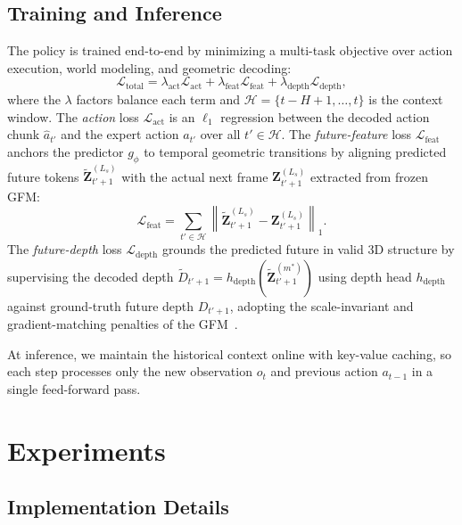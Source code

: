 \documentclass{llmxive}
\begin{document}
\subsection{Training and Inference}
\label{sec:method:training}
The policy is trained end-to-end by minimizing a multi-task objective over action execution, world modeling, and geometric decoding:
\begin{equation}
    \mathcal{L}_{\text{total}} = \lambda_{\text{act}} \mathcal{L}_{\text{act}} + \lambda_{\text{feat}} \mathcal{L}_{\text{feat}} + \lambda_{\text{depth}} \mathcal{L}_{\text{depth}},
\end{equation}
where the $\lambda$ factors balance each term and $\mathcal{H} = \{t-H+1, \ldots, t\}$ is the context window. The \emph{action} loss $\mathcal{L}_{\text{act}}$ is an $\ell_1$ regression between the decoded action chunk $\hat a_{t'}$ and the expert action $a_{t'}$ over all $t' \in \mathcal{H}$. The \emph{future-feature} loss $\mathcal{L}_{\text{feat}}$ anchors the predictor $g_\phi$ to temporal geometric transitions by aligning predicted future tokens $\tilde{\mathbf{Z}}_{t'+1}^{(L_s)}$ with the actual next frame $\mathbf{Z}_{t'+1}^{(L_s)}$ extracted from frozen GFM:
\begin{equation}
    \mathcal{L}_{\text{feat}} = \sum_{t' \in \mathcal{H}} \left\| \tilde{\mathbf{Z}}_{t'+1}^{(L_s)} - \mathbf{Z}_{t'+1}^{(L_s)} \right\|_1.
\end{equation}
The \emph{future-depth} loss $\mathcal{L}_{\text{depth}}$ grounds the predicted future in valid 3D structure by supervising the decoded depth $\tilde{D}_{t'+1}=h_{\text{depth}}(\tilde{\mathbf{Z}}_{t'+1}^{(m^*)})$ using depth head $h_{\text{depth}}$ against ground-truth future depth $D_{t'+1}$, adopting the scale-invariant and gradient-matching penalties of the GFM~\citep{lin2025depth, wang2026vggt}. 

At inference, we maintain the historical context online with key-value caching, so each step processes only the new observation $o_t$ and previous action $a_{t-1}$ in a single feed-forward pass. 

\section{Experiments}
\label{sec:exp}
\subsection{Implementation Details}
\end{document}

